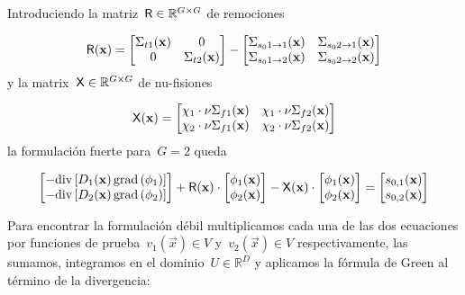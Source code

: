 \documentclass[
  12pt,
  a4paper,
  table]{scrbook}
\theoremstyle{plain}
\theoremstyle{definition}
\theoremstyle{plain}
\theoremstyle{plain}
\theoremstyle{remark}
\begin{document}
Introduciendo la matriz~\(\mathsf{R} \in \mathbb{R}^{G \times G}\) de
remociones

\[
\mathsf{R}(\mathbf{x}) =
\begin{bmatrix}
 \Sigma_{t1}(\mathbf{x}) & 0 \\
 0 & \Sigma_{t2}(\mathbf{x}) \\
\end{bmatrix}
-
\begin{bmatrix}
 \Sigma_{s_0 1 \rightarrow 1}(\mathbf{x}) & \Sigma_{s_0 2 \rightarrow 1}(\mathbf{x}) \\
 \Sigma_{s_0 1 \rightarrow 2}(\mathbf{x}) & \Sigma_{s_0 2 \rightarrow 2}(\mathbf{x}) \\
\end{bmatrix}
\] y la matrix~\(\mathsf{X} \in \mathbb{R}^{G \times G}\) de nu-fisiones

\[
\mathsf{X}(\mathbf{x}) =
\begin{bmatrix}
 \chi_1 \cdot \nu\Sigma_{f1}(\mathbf{x}) & \chi_1 \cdot \nu\Sigma_{f2}(\mathbf{x}) \\
 \chi_2 \cdot \nu\Sigma_{f1}(\mathbf{x}) & \chi_2 \cdot \nu\Sigma_{f2}(\mathbf{x}) \\
\end{bmatrix}
\] la formulación fuerte para~\(G=2\) queda

\[
\begin{bmatrix}
 - \text{div} \left[ D_1(\mathbf{x}) \, \text{grad} \left( \phi_1 \right) \right] \\
 - \text{div} \left[ D_2(\mathbf{x})\, \text{grad} \left( \phi_2 \right) \right] \\
\end{bmatrix}
+
\mathsf{R}(\mathbf{x})
\cdot
\begin{bmatrix}
 \phi_1(\mathbf{x}) \\
 \phi_2(\mathbf{x}) \\
\end{bmatrix}
-
\mathsf{X}(\mathbf{x})
\cdot
\begin{bmatrix}
 \phi_1(\mathbf{x}) \\
 \phi_2(\mathbf{x}) \\
\end{bmatrix}
=
\begin{bmatrix}
 s_{0,1}(\mathbf{x}) \\
 s_{0,2}(\mathbf{x}) \\
\end{bmatrix}
\]

Para encontrar la formulación débil multiplicamos cada una de las dos
ecuaciones por funciones de prueba~\(v_1(\vec{x}) \in V\)
y~\(v_2(\vec{x}) \in V\) respectivamente, las sumamos, integramos en el
dominio~\(U \in \mathbb{R}^D\) y aplicamos la fórmula de Green al
término de la divergencia:
\end{document}
